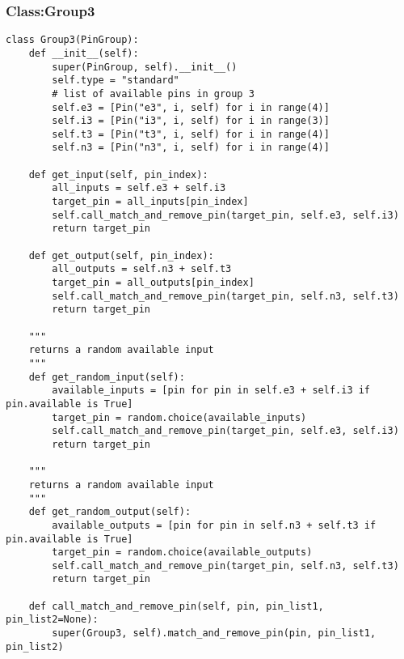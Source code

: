 \documentclass[a4paper]{article}
\begin{document}
\subsubsection{Class:Group3}
\label{sec-4-5-3}
\begin{verbatim}
class Group3(PinGroup):
    def __init__(self):
        super(PinGroup, self).__init__()
        self.type = "standard"
        # list of available pins in group 3
        self.e3 = [Pin("e3", i, self) for i in range(4)]
        self.i3 = [Pin("i3", i, self) for i in range(3)]
        self.t3 = [Pin("t3", i, self) for i in range(4)]
        self.n3 = [Pin("n3", i, self) for i in range(4)]

    def get_input(self, pin_index):
        all_inputs = self.e3 + self.i3
        target_pin = all_inputs[pin_index]
        self.call_match_and_remove_pin(target_pin, self.e3, self.i3)
        return target_pin

    def get_output(self, pin_index):
        all_outputs = self.n3 + self.t3
        target_pin = all_outputs[pin_index]
        self.call_match_and_remove_pin(target_pin, self.n3, self.t3)
        return target_pin

    """
    returns a random available input
    """
    def get_random_input(self):
        available_inputs = [pin for pin in self.e3 + self.i3 if pin.available is True]
        target_pin = random.choice(available_inputs)
        self.call_match_and_remove_pin(target_pin, self.e3, self.i3)
        return target_pin

    """
    returns a random available input
    """
    def get_random_output(self):
        available_outputs = [pin for pin in self.n3 + self.t3 if pin.available is True]
        target_pin = random.choice(available_outputs)
        self.call_match_and_remove_pin(target_pin, self.n3, self.t3)
        return target_pin

    def call_match_and_remove_pin(self, pin, pin_list1, pin_list2=None):
        super(Group3, self).match_and_remove_pin(pin, pin_list1, pin_list2)
\end{verbatim}
\end{document}
